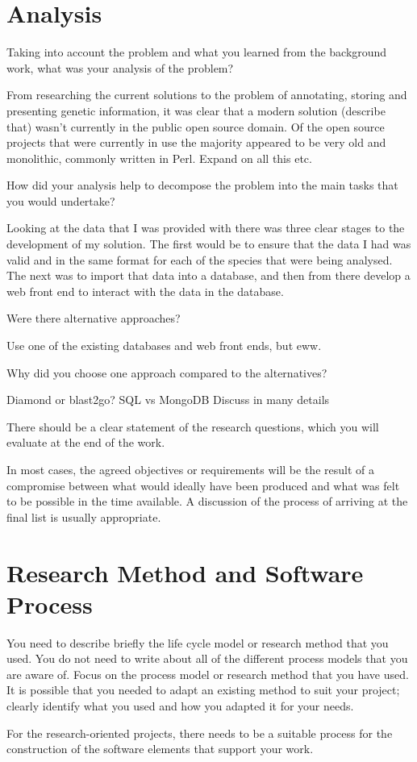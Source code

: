 \section{Analysis}
Taking into account the problem and what you learned from the background work, what was your analysis of the problem? 

From researching the current solutions to the problem of annotating, storing and presenting genetic information, it was clear that a modern solution (describe that) wasn't currently in the public open source domain. Of the open source projects that were currently in use the majority appeared to be very old and monolithic, commonly written in Perl. Expand on all this etc.

How did your analysis help to decompose the problem into the main tasks that you would undertake?

Looking at the data that I was provided with there was three clear stages to the development of my solution. The first would be to ensure that the data I had was valid and in the same format for each of the species that were being analysed. The next was to import that data into a database, and then from there develop a web front end to interact with the data in the database. 

Were there alternative approaches? 

Use one of the existing databases and web front ends, but eww.

Why did you choose one approach compared to the alternatives? 

Diamond or blast2go?
SQL vs MongoDB Discuss in many details

There should be a clear statement of the research questions, which you will evaluate at the end of the work. 

In most cases, the agreed objectives or requirements will be the result of a compromise between what would ideally have been produced and what was felt to be possible in the time available. A discussion of the process of arriving at the final list is usually appropriate.

\section{Research Method and Software Process}
You need to describe briefly the life cycle model or research method that you used. You do not need to write about all of the different process models that you are aware of. Focus on the process model or research method that you have used. It is possible that you needed to adapt an existing method to suit your project; clearly identify what you used and how you adapted it for your needs.

For the research-oriented projects, there needs to be a suitable process for the construction of the software elements that support your work. 
